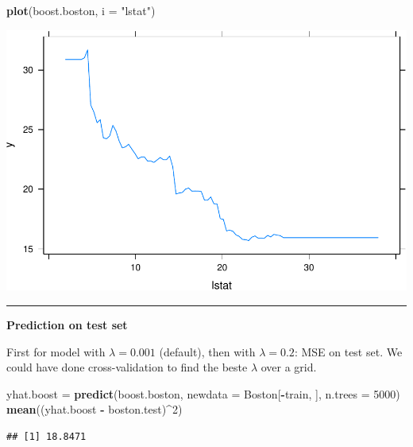 \documentclass[]{article}
\newenvironment{Shaded}{\begin{snugshade}}{\end{snugshade}}
\newcommand{\DataTypeTok}[1]{\textcolor[rgb]{0.13,0.29,0.53}{#1}}
\newcommand{\DecValTok}[1]{\textcolor[rgb]{0.00,0.00,0.81}{#1}}
\newcommand{\KeywordTok}[1]{\textcolor[rgb]{0.13,0.29,0.53}{\textbf{#1}}}
\newcommand{\NormalTok}[1]{#1}
\newcommand{\OperatorTok}[1]{\textcolor[rgb]{0.81,0.36,0.00}{\textbf{#1}}}
\newcommand{\StringTok}[1]{\textcolor[rgb]{0.31,0.60,0.02}{#1}}
\begin{document}
\begin{Shaded}
\begin{Highlighting}[]
\KeywordTok{plot}\NormalTok{(boost.boston, }\DataTypeTok{i =} \StringTok{"lstat"}\NormalTok{)}
\end{Highlighting}
\end{Shaded}

\includegraphics{8Trees_files/figure-latex/unnamed-chunk-48-2.pdf}

\begin{center}\rule{0.5\linewidth}{\linethickness}\end{center}

\textbf{Prediction on test set}

First for model with \(\lambda=0.001\) (default), then with
\(\lambda=0.2\): MSE on test set. We could have done cross-validation to
find the beste \(\lambda\) over a grid.

\begin{Shaded}
\begin{Highlighting}[]
\NormalTok{yhat.boost =}\StringTok{ }\KeywordTok{predict}\NormalTok{(boost.boston, }\DataTypeTok{newdata =}\NormalTok{ Boston[}\OperatorTok{-}\NormalTok{train, ], }\DataTypeTok{n.trees =} \DecValTok{5000}\NormalTok{)}
\KeywordTok{mean}\NormalTok{((yhat.boost }\OperatorTok{-}\StringTok{ }\NormalTok{boston.test)}\OperatorTok{^}\DecValTok{2}\NormalTok{)}
\end{Highlighting}
\end{Shaded}

\begin{verbatim}
## [1] 18.8471
\end{verbatim}
\end{document}
